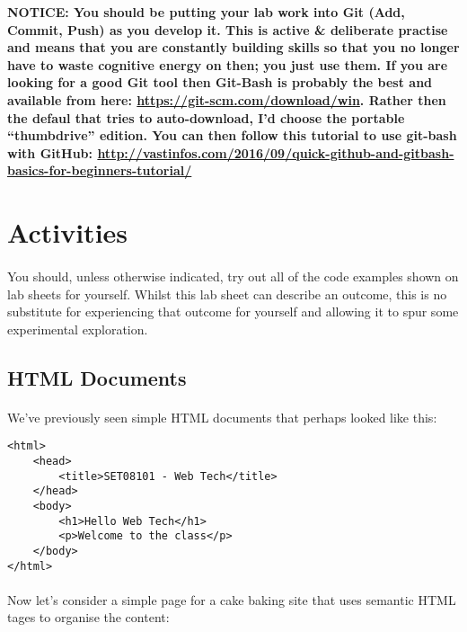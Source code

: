 \documentclass[10pt, a4paper, twosize]{article}
\begin{document}
\begin{framed}
{\bf{NOTICE:} You should be putting your lab work into Git (Add, Commit, Push) as you develop it. This is active \& deliberate practise and means that you are constantly building skills so that you no longer have to waste cognitive energy on then; you just use them. If you are looking for a good Git tool then Git-Bash is probably the best and available from here: \url{https://git-scm.com/download/win}. Rather then the defaul that tries to auto-download, I'd choose the portable ``thumbdrive'' edition. You can then follow this tutorial to use git-bash with GitHub: \url{http://vastinfos.com/2016/09/quick-github-and-gitbash-basics-for-beginners-tutorial/} }
\end{framed}


\section{Activities}

\paragraph{} You should, unless otherwise indicated, try out all of the code examples shown on lab sheets for yourself. Whilst this lab sheet can describe an outcome, this is no substitute for experiencing that outcome for yourself and allowing it to spur some experimental exploration.

\subsection{HTML Documents}
\paragraph{} We've previously seen simple HTML documents that perhaps looked like this:

\begin{lstlisting}
<html>
    <head>
        <title>SET08101 - Web Tech</title>
    </head>
    <body>
        <h1>Hello Web Tech</h1>
        <p>Welcome to the class</p>
    </body>
</html>
\end{lstlisting}

\paragraph{} Now let's consider a simple page for a cake baking site that uses semantic HTML tages to organise the content:
\end{document}
